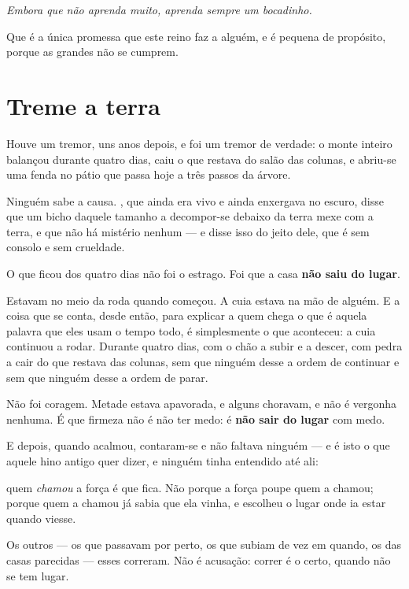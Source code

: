 \documentclass[livro.tex]{subfiles}
\begin{document}
\emph{Embora que não aprenda muito, aprenda sempre um bocadinho.}

Que é a única promessa que este reino faz a alguém, e é pequena de propósito, porque as grandes
não se cumprem.

\section{Treme a terra}

Houve um tremor, uns anos depois, e foi um tremor de verdade: o monte inteiro balançou durante
quatro dias, caiu o que restava do salão das colunas, e abriu-se uma fenda no pátio que passa
hoje a três passos da árvore.

Ninguém sabe a causa. \Drk , que ainda era vivo e ainda enxergava no escuro, disse que um bicho
daquele tamanho a decompor-se debaixo da terra mexe com a terra, e que não há mistério nenhum ---
e disse isso do jeito dele, que é sem consolo e sem crueldade.

\medskip

O que ficou dos quatro dias não foi o estrago. Foi que a casa \textbf{não saiu do lugar}.

Estavam no meio da roda quando começou. A cuia estava na mão de alguém. E a coisa que se conta,
desde então, para explicar a quem chega o que é aquela palavra que eles usam o tempo todo, é
simplesmente o que aconteceu: a cuia continuou a rodar. Durante quatro dias, com o chão a subir
e a descer, com pedra a cair do que restava das colunas, sem que ninguém desse a ordem de
continuar e sem que ninguém desse a ordem de parar.

Não foi coragem. Metade estava apavorada, e alguns choravam, e não é vergonha nenhuma. É que
firmeza não é não ter medo: é \textbf{não sair do lugar} com medo.

\medskip

E depois, quando acalmou, contaram-se e não faltava ninguém --- e é isto o que aquele hino
antigo quer dizer, e ninguém tinha entendido até ali:

quem \emph{chamou} a força é que fica. Não porque a força poupe quem a chamou; porque quem a
chamou já sabia que ela vinha, e escolheu o lugar onde ia estar quando viesse.

Os outros --- os que passavam por perto, os que subiam de vez em quando, os das casas parecidas
--- esses correram. Não é acusação: correr é o certo, quando não se tem lugar.
\end{document}
